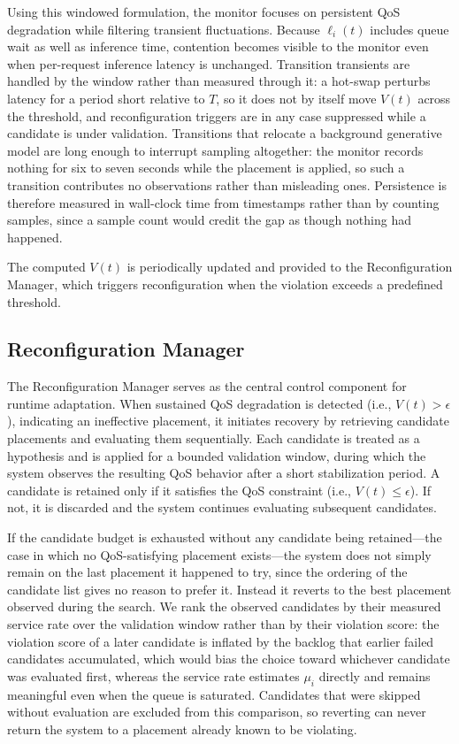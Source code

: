\documentclass[conference]{IEEEtran}
\begin{document}
Using this windowed formulation, the monitor focuses on persistent QoS degradation while filtering transient fluctuations.
Because $\ell_i(t)$ includes queue wait as well as inference time, contention becomes visible to the monitor even when per-request inference latency is unchanged. \textcolor{navyblue}{Transition transients are handled by the window rather than measured through it: a hot-swap perturbs latency for a period short relative to $T$, so it does not by itself move $V(t)$ across the threshold, and reconfiguration triggers are in any case suppressed while a candidate is under validation. Transitions that relocate a background generative model are long enough to interrupt sampling altogether: the monitor records nothing for six to seven seconds while the placement is applied, so such a transition contributes no observations rather than misleading ones. Persistence is therefore measured in wall-clock time from timestamps rather than by counting samples, since a sample count would credit the gap as though nothing had happened.}

The computed $V(t)$ is periodically updated and provided to the Reconfiguration Manager, which triggers reconfiguration when the violation exceeds a predefined threshold.

\subsection{Reconfiguration Manager}

The Reconfiguration Manager serves as the central control component for runtime adaptation. 
When sustained QoS degradation is detected (i.e., $V(t) > \epsilon$), indicating an ineffective placement, it initiates recovery by retrieving candidate placements and evaluating them sequentially.
%
Each candidate is treated as a hypothesis and is applied for a bounded validation window, during which the system observes the resulting QoS behavior after a short stabilization period. 
A candidate is retained only if it satisfies the QoS constraint (i.e., $V(t) \le \epsilon$). If not, it is discarded and the system continues evaluating subsequent candidates.

\textcolor{navyblue}{If the candidate budget is exhausted without any candidate being retained---the case in which no QoS-satisfying placement exists---the system does not simply remain on the last placement it happened to try, since the ordering of the candidate list gives no reason to prefer it. Instead it reverts to the best placement observed during the search. We rank the observed candidates by their measured service rate over the validation window rather than by their violation score: the violation score of a later candidate is inflated by the backlog that earlier failed candidates accumulated, which would bias the choice toward whichever candidate was evaluated first, whereas the service rate estimates $\mu_i$ directly and remains meaningful even when the queue is saturated. Candidates that were skipped without evaluation are excluded from this comparison, so reverting can never return the system to a placement already known to be violating.}
\end{document}
